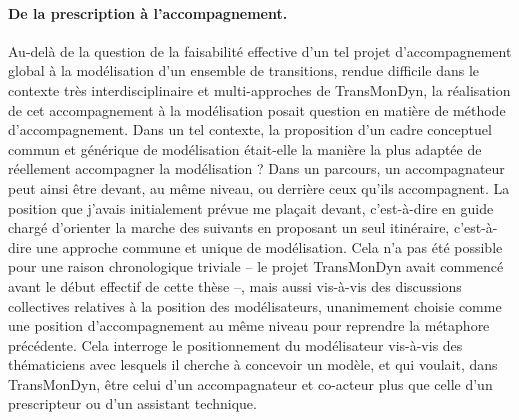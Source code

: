 \paragraph{De la prescription à l'accompagnement.}

Au-delà de la question de la faisabilité effective d'un tel projet d'accompagnement global à la modélisation d'un ensemble de transitions, rendue difficile dans le contexte très interdisciplinaire et multi-approches de TransMonDyn, la réalisation de cet \og accompagnement à la modélisation\fg{} posait question en matière de méthode d'accompagnement.
Dans un tel contexte, la proposition d'un cadre conceptuel commun et générique de modélisation était-elle la manière la plus adaptée de réellement \og accompagner\fg{} la modélisation ?
Dans un parcours, un accompagnateur peut ainsi être devant, au même niveau, ou derrière ceux qu'ils accompagnent.
La position que j'avais initialement prévue me plaçait \og devant\fg{}, c'est-à-dire en guide chargé d'orienter la marche des suivants en proposant un seul itinéraire, c'est-à-dire une approche commune et unique de modélisation.
Cela n'a pas été possible pour une raison chronologique triviale -- le projet TransMonDyn avait commencé avant le début effectif de cette thèse --, mais aussi vis-à-vis des discussions collectives relatives à la position des modélisateurs, unanimement choisie comme une position d'accompagnement \og au même niveau\fg{} pour reprendre la métaphore précédente.
Cela interroge le positionnement du modélisateur vis-à-vis des thématiciens \og avec\fg{} lesquels il cherche à concevoir un modèle, et qui voulait, dans TransMonDyn, être celui d'un \og accompagnateur\fg{} et co-acteur plus que celle d'un prescripteur ou d'un assistant technique.


